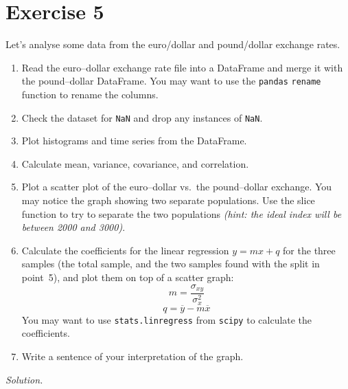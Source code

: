 \documentclass[11pt]{article}
\begin{document}
\section{Exercise 5}
Let's analyse some data from the euro/dollar and pound/dollar exchange rates.
\begin{enumerate}
    \item Read the euro--dollar exchange rate file into a DataFrame and merge it with the pound--dollar DataFrame. You may want to use the \texttt{pandas} \texttt{rename} function to rename the columns.
    \item Check the dataset for \texttt{NaN} and drop any instances of \texttt{NaN}.
    \item Plot histograms and time series from the DataFrame.
    \item Calculate mean, variance, covariance, and correlation.
    \item Plot a scatter plot of the euro--dollar vs.\ the pound--dollar exchange. You may notice the graph showing two separate populations. Use the slice function to try to separate the two populations \emph{(hint: the ideal index will be between 2000 and 3000)}.
    \item Calculate the coefficients for the linear regression \(y = mx + q\) for the three samples (the total sample, and the two samples found with the split in point~5), and plot them on top of a scatter graph:
    \[
        m = \dfrac{\sigma_{xy}}{\sigma_x^2}
    \]
    \[
        q = \overline{y}-m\overline{x}
    \]
    You may want to use \texttt{stats.linregress} from \texttt{scipy} to calculate the coefficients.
    \item Write a sentence of your interpretation of the graph.
\end{enumerate}
\textit{Solution.}
\end{document}
